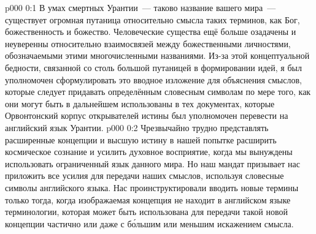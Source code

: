 \author{Божественный Советник}
\vs p000 0:1 В умах смертных Урантии~--- таково название вашего мира~--- существует огромная путаница относительно смысла таких терминов, как Бог, божественность и божество. Человеческие существа ещё больше озадачены и неуверенны относительно взаимосвязей между божественными личностями, обозначаемыми этими многочисленными названиями. Из\hyp{}за этой концептуальной бедности, связанной со столь большой путаницей в формировании идей, я был уполномочен сформулировать это вводное изложение для объяснения смыслов, которые следует придавать определённым словесным символам по мере того, как они могут быть в дальнейшем использованы в тех документах, которые Орвонтонский корпус открывателей истины был уполномочен перевести на английский язык Урантии.
\vs p000 0:2 Чрезвычайно трудно представлять расширенные концепции и высшую истину в нашей попытке расширить космическое сознание и усилить духовное восприятие, когда мы вынуждены использовать ограниченный язык данного мира. Но наш мандат призывает нас приложить все усилия для передачи наших смыслов, используя словесные символы английского языка. Нас проинструктировали вводить новые термины только тогда, когда изображаемая концепция не находит в английском языке терминологии, которая может быть использована для передачи такой новой концепции частично или даже с б\'ольшим или меньшим искажением смысла.
